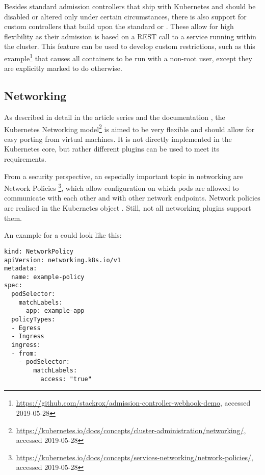 Besides standard admission controllers that ship with Kubernetes and should be disabled or altered only under certain circumstances, there is also support for custom controllers that build upon the standard  or . These allow for high flexibility as their admission is based on a REST call to a service running within the cluster. This feature can be used to develop custom restrictions, such as this example\footnote{\url{https://github.com/stackrox/admission-controller-webhook-demo}, accessed 2019-05-28} that causes all containers to be run with a non-root user, except they are explicitly marked to do otherwise. 

\subsection{Networking}


As described in detail in the article series \textcite{NetworkingExplained} and the documentation \textcite{k8sdocs}, the Kubernetes Networking model\footnote{\url{https://kubernetes.io/docs/concepts/cluster-administration/networking/}, accessed 2019-05-28} is aimed to be very flexible and should allow for easy porting from virtual machines. It is not directly implemented in the Kubernetes core, but rather different plugins can be used to meet its requirements.

From a security perspective, an especially important topic in networking are Network Policies \footnote{\url{https://kubernetes.io/docs/concepts/services-networking/network-policies/}, accessed 2019-05-28}, which allow configuration on which pods are allowed to communicate with each other and with other network endpoints. Network policies are realised in the Kubernetes object . Still, not all networking plugins support them.

An example for a  could look like this:

\begin{lstlisting}[frame=single]
kind: NetworkPolicy
apiVersion: networking.k8s.io/v1
metadata:
  name: example-policy
spec:
  podSelector:
    matchLabels:
      app: example-app
  policyTypes:
  - Egress
  - Ingress
  ingress:
  - from:
    - podSelector:
        matchLabels:
          access: "true"
\end{lstlisting}

